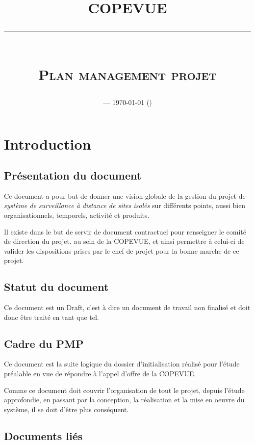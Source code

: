 \documentclass[a4paper, 11pt, draft]{report}
\title{\textbf{COPEVUE}\\
\rule{\textwidth}{1pt}{}\\
\Huge{\textsc{Plan management projet}}}
\author{\docauthor{}}
\date{\docname{} --- \today{} (\docstatus{})}
\begin{document}
\maketitle

\tableofcontents

\pagebreak


\chapter{Introduction}

\section{Présentation du document}

Ce document a pour but de donner une vision globale de la gestion du projet de \emph{système de surveillance à distance de sites isolés} sur différents points, aussi bien organisationnels, temporels, activité et produits.

Il existe dans le but de servir de document contractuel pour renseigner le comité de direction du projet, au sein de la COPEVUE, et ainsi permettre à celui-ci de valider les dispositions prises par le chef de projet pour la bonne marche de ce projet.


\section{Statut du document}

Ce document est un Draft, c'est à dire un document de travail non finalisé et doit donc être traité en tant que tel.

\section{Cadre du PMP}

Ce document est la suite logique du dossier d'initialisation réalisé pour l'étude préalable en vue de répondre à l'appel d'offre de la COPEVUE.

Comme ce document doit couvrir l'organisation de tout le projet, depuis l'étude approfondie, en passant par la conception, la réalisation et la mise en oeuvre du système, il se doit d'être plus conséquent.


\section{Documents liés}
\end{document}
